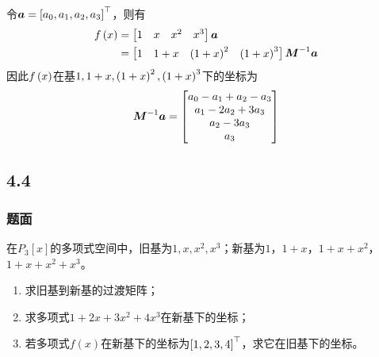 \documentclass{beamer}
\begin{document}
\begin{frame}[allowframebreaks]
\begin{enumerate}
{              令\(\boldsymbol{a}=\left[ a_0,a_1,a_2,a_3 \right]^\top\)，则有
              \begin{align*}
                  f\left( x \right)
                   & =
                  \begin{bmatrix}
                      1 & x & x^2 & x^3
                  \end{bmatrix}\boldsymbol{a} \\
                   & =
                  \begin{bmatrix}
                      1 & 1+x & \left( 1+x \right)^2 & \left( 1+x \right)^3
                  \end{bmatrix}{\boldsymbol{M}}^{-1}\boldsymbol{a}
              \end{align*}
              因此\(f\left( x \right)\)在基\(1,1+x,\left( 1+x \right)^2,\left( 1+x \right)^3\)下的坐标为
              \begin{equation*}
                  {\boldsymbol{M}}^{-1}\boldsymbol{a}=
                  \begin{bmatrix}
                      a_0-a_1+a_2-a_3 \\
                      a_1-2a_2+3a_3   \\
                      a_2-3a_3        \\
                      a_3
                  \end{bmatrix}
              \end{equation*}
              }
    \end{enumerate}
\end{frame}

\subsection*{4.4}
\begin{frame}
    \frametitle{题面}
    在\(P_3[x]\)的多项式空间中，旧基为\(1,x,x^2,x^3\)；新基为\(1\)，\(1+x\)，\(1+x+x^2\)，\(1+x+x^2+x^3\)。
    \begin{enumerate}
        \item 求旧基到新基的过渡矩阵；
        \item 求多项式\(1+2x+3x^2+4x^3\)在新基下的坐标；
        \item 若多项式\(f(x)\)在新基下的坐标为\(\left[ 1,2,3,4 \right]^\top\)，求它在旧基下的坐标。
    \end{enumerate}
\end{frame}
\end{document}
